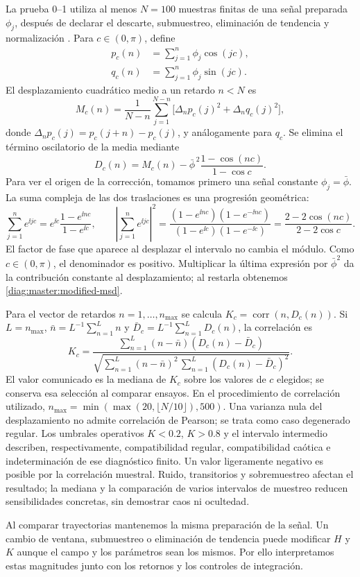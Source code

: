 La prueba 0--1 utiliza al menos $N=100$ muestras finitas de una señal
preparada $\phi_j$, después de
declarar el descarte, submuestreo, eliminación de tendencia y
normalización \cite{gottwald2009}. Para $c\in(0,\pi)$, define
\begin{align}
 p_c(n)&=\sum_{j=1}^n\phi_j\cos(jc),\nonumber\\
 q_c(n)&=\sum_{j=1}^n\phi_j\sin(jc).
 \label{diag:master:translations}
\end{align}
El desplazamiento cuadrático medio a un retardo $n<N$ es
\begin{equation}
 M_c(n)=\frac1{N-n}\sum_{j=1}^{N-n}
 \bigl[\Delta_np_c(j)^2+\Delta_nq_c(j)^2\bigr],
 \label{diag:master:msd}
\end{equation}
donde $\Delta_np_c(j)=p_c(j+n)-p_c(j)$, y análogamente para $q_c$.
Se elimina el término oscilatorio de la media mediante
\begin{equation}
 D_c(n)=M_c(n)-\bar\phi^{\,2}
                 \frac{1-\cos(nc)}{1-\cos c}.
 \label{diag:master:modified-msd}
\end{equation}
Para ver el origen de la corrección, tomamos primero una señal
constante \(\phi_j=\bar\phi\). La suma compleja de las dos traslaciones
es una progresión geométrica:
\[
 \sum_{j=1}^ne^{\ii jc}
 =e^{\ii c}\frac{1-e^{\ii nc}}{1-e^{\ii c}},\qquad
 \left|\sum_{j=1}^ne^{\ii jc}\right|^2
 =\frac{(1-e^{\ii nc})(1-e^{-\ii nc})}
       {(1-e^{\ii c})(1-e^{-\ii c})}
 =\frac{2-2\cos(nc)}{2-2\cos c}.
\]
El factor de fase que aparece al desplazar el intervalo no cambia el módulo.
Como \(c\in(0,\pi)\), el denominador es positivo. Multiplicar la última
expresión por \(\bar\phi^2\) da la contribución constante al desplazamiento;
al restarla obtenemos \cref{diag:master:modified-msd}.

Para el vector de retardos $n=1,\ldots,n_{\max}$ se calcula
\(K_c=\operatorname{corr}(n,D_c(n))\). Si \(L=n_{\max}\),
\(\bar n=L^{-1}\sum_{n=1}^Ln\) y
\(\bar D_c=L^{-1}\sum_{n=1}^LD_c(n)\), la correlación es
\[
 K_c=\frac{\sum_{n=1}^L(n-\bar n)(D_c(n)-\bar D_c)}
 {\sqrt{\sum_{n=1}^L(n-\bar n)^2\,
                \sum_{n=1}^L(D_c(n)-\bar D_c)^2}}.
\]
El valor comunicado es la mediana
de $K_c$ sobre los valores de $c$ elegidos; se conserva esa selección al
comparar ensayos. En el procedimiento de correlación utilizado,
$n_{\max}=\min(\max(20,\lfloor N/10\rfloor),500)$.
Una varianza nula del desplazamiento no admite correlación de Pearson;
se trata como caso degenerado regular. Los umbrales operativos
$K<0.2$, $K>0.8$ y el intervalo intermedio describen, respectivamente,
compatibilidad regular, compatibilidad caótica e indeterminación de ese
diagnóstico finito. Un valor ligeramente negativo es posible por la
correlación muestral. Ruido, transitorios y sobremuestreo afectan el
resultado; la mediana y la comparación de varios intervalos de muestreo
reducen sensibilidades concretas, sin demostrar caos ni ocultedad.

Al comparar trayectorias mantenemos la misma preparación de la señal.
Un cambio de ventana, submuestreo o eliminación de tendencia puede modificar
\(H\) y \(K\) aunque el campo y los parámetros sean los mismos. Por ello
interpretamos estas magnitudes junto con los retornos y los controles de
integración.
